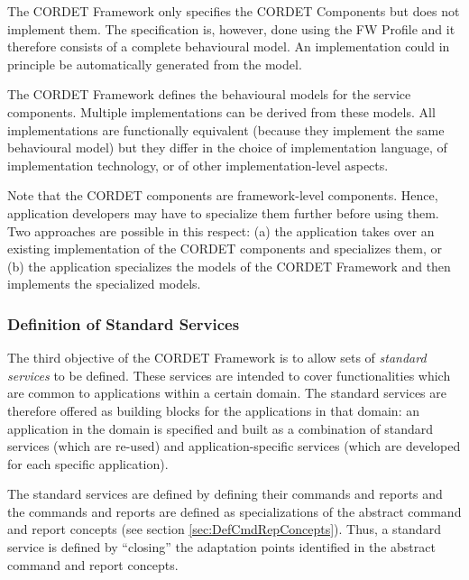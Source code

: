 \documentclass[a4paper,10pt]{article}
\begin{document}
The CORDET Framework only specifies the CORDET Components but does not implement them. 
The specification is, however, done using the FW Profile and it therefore consists of a complete behavioural model. 
An implementation could in principle be automatically generated from the model. 

The CORDET Framework defines the behavioural models for the service components. 
Multiple implementations can be derived from these models. 
All implementations are functionally equivalent (because they implement the same behavioural model) but they differ in the choice of implementation language, of implementation technology, or of other implementation-level aspects. 

Note that the CORDET components are framework-level components. 
Hence, application developers may have to specialize them further before using them. 
Two approaches are possible in this respect: (a) the application takes over an existing implementation of the CORDET components and specializes them, or (b) the application specializes the models of the CORDET Framework and then implements the specialized models.

\subsubsection{Definition of Standard Services}\label{sec:StdServ}
The third objective of the CORDET Framework is to allow sets of \textit{standard services} to be defined. 
These services are intended to cover functionalities which are common to applications within a certain domain. 
The standard services are therefore offered as building blocks for the applications in that domain: 
an application in the domain is specified and built as a combination of standard services (which are re-used) and application-specific services (which are developed for each specific application).

The standard services are defined by defining their commands and reports and the commands and reports are defined as specializations of the abstract command and report concepts (see section \ref{sec:DefCmdRepConcepts}). 
Thus, a standard service is defined by “closing” the adaptation points identified in the abstract command and report concepts.
\end{document}
